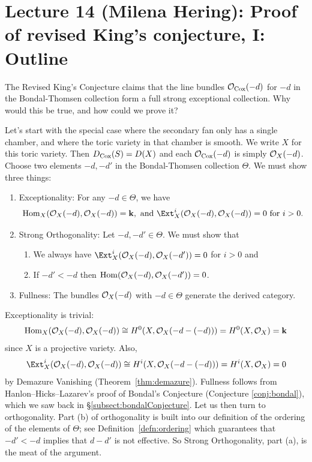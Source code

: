 \documentclass{amsart}
\begin{document}
\fi

\section{Lecture 14 (Milena Hering): Proof of revised King's conjecture, I: Outline}\label{lec:14-proof-outline}
The Revised King's Conjecture claims that the line bundles ${\mathcal O}_{\operatorname{Cox}}(-d)$ for $-d$ in the Bondal-Thomsen collection form a full strong exceptional collection.  Why would this be true, and how could we prove it?

Let's start with the special case where the secondary fan only has a single chamber, and where the toric variety in that chamber is smooth.  We write $X$ for this toric variety.  Then $D_{\operatorname{Cox}}(S)=D(X)$ and each ${\mathcal O}_{\operatorname{Cox}}(-d)$ is simply ${\mathcal O}_{X}(-d)$.  Choose two elements $-d,-d'$ in the Bondal-Thomsen collection $\Theta$.  We must show three things:
\begin{enumerate}
    \item Exceptionality:  For any $-d\in \Theta$, we have
    \[
    \Hom_{X}(\cO_{X}(-d), \cO_{X}(-d)) = \k, \text{ and }
    \Ext^i_{X}(\cO_{X}(-d), \cO_{X}(-d)) = 0 \text { for $i>0$.}
    \]
    \item Strong Orthogonality: Let $-d,-d'\in \Theta$.  We must show that
       \begin{enumerate}
             \item  We always have $\Ext^i_{X}(\cO_{X}(-d), \cO_{X}(-d')) = 0$ for $i>0$ and
              \item If $-d'<-d$ then $\operatorname{Hom}({\mathcal O}_{X}(-d), {\mathcal O}_{X}(-d'))=0$.
     \end{enumerate}
    \item Fullness:  The bundles ${\mathcal O}_{X}(-d)$ with $-d\in \Theta$ generate the derived category.
\end{enumerate}
Exceptionality is trivial:
\[
\operatorname{Hom}_{X}({\mathcal O}_{X}(-d), {\mathcal O}_{X}(-d)) \cong H^0(X, {\mathcal O}_{X}(-d -(-d))) = H^0(X, {\mathcal O}_{X}) = \mathbf{k}
\]
since $X$ is a projective variety.  Also,
\[
\Ext^i_{X}(\cO_{X}(-d), \cO_{X}(-d)) \cong H^i(X, \cO_{X}(-d -(-d))) = H^i(X, \cO_{X}) = 0
\]
by Demazure Vanishing (Theorem~\ref{thm:demazure}). Fullness follows from Hanlon--Hicks--Lazarev's proof of  Bondal's Conjecture (Conjecture \ref{conj:bondal}), which we saw back in \S\ref{subsect:bondalConjecture}. Let us then turn to orthogonality.  Part (b) of orthogonality is built into our definition of the ordering of the elements of $\Theta$; see Definition~\ref{defn:ordering} which guarantees that $-d'<-d$ implies that $d-d'$ is not effective.  So Strong Orthogonality, part (a), is the meat of the argument.
\end{document}

